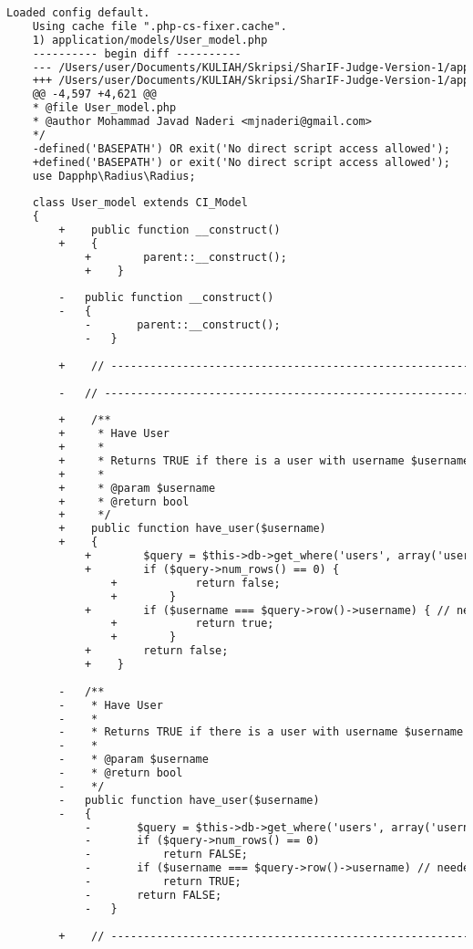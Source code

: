 \begin{lstlisting}[language=diff, caption=Perubahan pada kode User\_model.php]
	Loaded config default.
	Using cache file ".php-cs-fixer.cache".
	1) application/models/User_model.php
	---------- begin diff ----------
	--- /Users/user/Documents/KULIAH/Skripsi/SharIF-Judge-Version-1/application/models/User_model.php
	+++ /Users/user/Documents/KULIAH/Skripsi/SharIF-Judge-Version-1/application/models/User_model.php
	@@ -4,597 +4,621 @@
	* @file User_model.php
	* @author Mohammad Javad Naderi <mjnaderi@gmail.com>
	*/
	-defined('BASEPATH') OR exit('No direct script access allowed');
	+defined('BASEPATH') or exit('No direct script access allowed');
	use Dapphp\Radius\Radius;
	
	class User_model extends CI_Model
	{
		+    public function __construct()
		+    {
			+        parent::__construct();
			+    }
		
		-	public function __construct()
		-	{
			-		parent::__construct();
			-	}
		
		+    // ------------------------------------------------------------------------
		
		-	// ------------------------------------------------------------------------
		
		+    /**
		+     * Have User
		+     *
		+     * Returns TRUE if there is a user with username $username in database
		+     *
		+     * @param $username
		+     * @return bool
		+     */
		+    public function have_user($username)
		+    {
			+        $query = $this->db->get_where('users', array('username' => $username));
			+        if ($query->num_rows() == 0) {
				+            return false;
				+        }
			+        if ($username === $query->row()->username) { // needed (because of utf8_general_ci [ci=case insensitive])
				+            return true;
				+        }
			+        return false;
			+    }
		
		-	/**
		-	 * Have User
		-	 *
		-	 * Returns TRUE if there is a user with username $username in database
		-	 *
		-	 * @param $username
		-	 * @return bool
		-	 */
		-	public function have_user($username)
		-	{
			-		$query = $this->db->get_where('users', array('username'=>$username));
			-		if ($query->num_rows() == 0)
			-			return FALSE;
			-		if ($username === $query->row()->username) // needed (because of utf8_general_ci [ci=case insensitive])
			-			return TRUE;
			-		return FALSE;
			-	}
		
		+    // ------------------------------------------------------------------------
		

\end{lstlisting}
